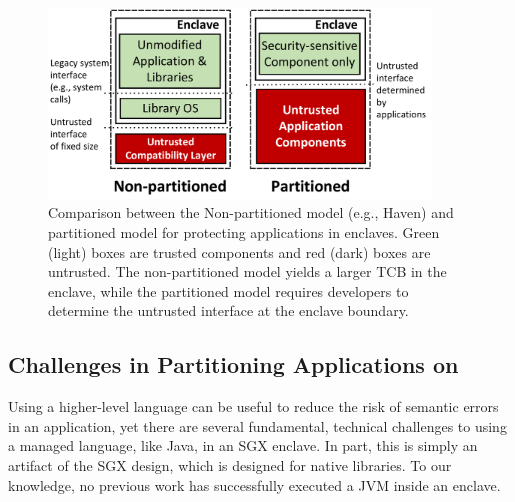 \begin{figure}[t!]
\centering
\includegraphics[width=4in]{graphene-sgx/figures/libosvssdk.pdf}
\footnotesize
\caption[Comparison between two usage models of \sgx{}.]
{Comparison between the Non-partitioned model (e.g., Haven)
and partitioned model for protecting applications in enclaves.
Green (light) boxes are trusted components and red (dark) boxes are untrusted.
The non-partitioned model yields a larger TCB in the enclave,
while the partitioned model requires developers to determine the untrusted interface at the enclave boundary.}
\label{fig:civet:libosvssdk}
\end{figure}

\subsection{Challenges in Partitioning \java{} Applications on \sgx{}}

Using a higher-level language can be useful to reduce the risk of semantic errors in an application,
yet there are several fundamental, technical challenges to using a managed language, like Java,
in an SGX enclave.
In part, this is simply an artifact of the SGX design, which is designed
for native libraries.
To our knowledge, no previous work has successfully executed a JVM inside an enclave.

  
